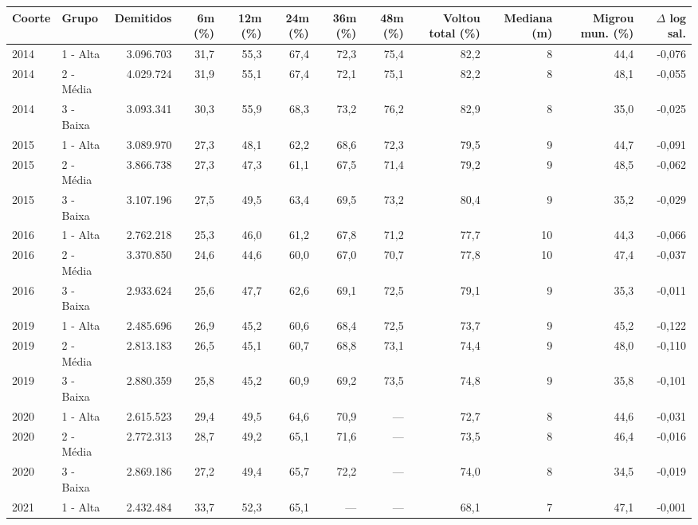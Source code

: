 \providecommand{\toprule}{\hline\hline}
\providecommand{\midrule}{\hline}
\providecommand{\bottomrule}{\hline\hline}
\providecommand{\addlinespace}[1][]{}
{\small
\renewcommand{\arraystretch}{1.12}
\begin{tabular}{llrrrrrrrrrr}
\toprule
Coorte & Grupo & Demitidos & 6m (\%) & 12m (\%) & 24m (\%) & 36m (\%) & 48m (\%) & Voltou total (\%) & Mediana (m) & Migrou mun. (\%) & $\Delta$ log sal. \\
\midrule
2014 & 1 - Alta & 3.096.703 & 31,7 & 55,3 & 67,4 & 72,3 & 75,4 & 82,2 & 8 & 44,4 & -0,076 \\
2014 & 2 - Média & 4.029.724 & 31,9 & 55,1 & 67,4 & 72,1 & 75,1 & 82,2 & 8 & 48,1 & -0,055 \\
2014 & 3 - Baixa & 3.093.341 & 30,3 & 55,9 & 68,3 & 73,2 & 76,2 & 82,9 & 8 & 35,0 & -0,025 \\
\addlinespace[3pt]
2015 & 1 - Alta & 3.089.970 & 27,3 & 48,1 & 62,2 & 68,6 & 72,3 & 79,5 & 9 & 44,7 & -0,091 \\
2015 & 2 - Média & 3.866.738 & 27,3 & 47,3 & 61,1 & 67,5 & 71,4 & 79,2 & 9 & 48,5 & -0,062 \\
2015 & 3 - Baixa & 3.107.196 & 27,5 & 49,5 & 63,4 & 69,5 & 73,2 & 80,4 & 9 & 35,2 & -0,029 \\
\addlinespace[3pt]
2016 & 1 - Alta & 2.762.218 & 25,3 & 46,0 & 61,2 & 67,8 & 71,2 & 77,7 & 10 & 44,3 & -0,066 \\
2016 & 2 - Média & 3.370.850 & 24,6 & 44,6 & 60,0 & 67,0 & 70,7 & 77,8 & 10 & 47,4 & -0,037 \\
2016 & 3 - Baixa & 2.933.624 & 25,6 & 47,7 & 62,6 & 69,1 & 72,5 & 79,1 & 9 & 35,3 & -0,011 \\
\addlinespace[3pt]
2019 & 1 - Alta & 2.485.696 & 26,9 & 45,2 & 60,6 & 68,4 & 72,5 & 73,7 & 9 & 45,2 & -0,122 \\
2019 & 2 - Média & 2.813.183 & 26,5 & 45,1 & 60,7 & 68,8 & 73,1 & 74,4 & 9 & 48,0 & -0,110 \\
2019 & 3 - Baixa & 2.880.359 & 25,8 & 45,2 & 60,9 & 69,2 & 73,5 & 74,8 & 9 & 35,8 & -0,101 \\
\addlinespace[3pt]
2020 & 1 - Alta & 2.615.523 & 29,4 & 49,5 & 64,6 & 70,9 & --- & 72,7 & 8 & 44,6 & -0,031 \\
2020 & 2 - Média & 2.772.313 & 28,7 & 49,2 & 65,1 & 71,6 & --- & 73,5 & 8 & 46,4 & -0,016 \\
2020 & 3 - Baixa & 2.869.186 & 27,2 & 49,4 & 65,7 & 72,2 & --- & 74,0 & 8 & 34,5 & -0,019 \\
\addlinespace[3pt]
2021 & 1 - Alta & 2.432.484 & 33,7 & 52,3 & 65,1 & --- & --- & 68,1 & 7 & 47,1 & -0,001 \\

\end{tabular}}
